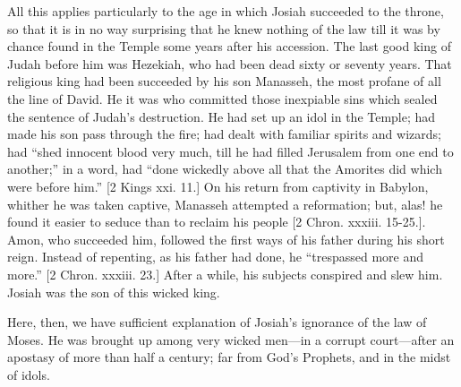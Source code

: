 All this applies particularly to the age in which Josiah succeeded
to the throne, so that it is in no way surprising that he knew nothing
of the law till it was by chance found in the Temple some years after
his accession. The last good king of Judah before him was Hezekiah,
who had been dead sixty or seventy years. That religious king had been
succeeded by his son Manasseh, the most profane of all the line of
David. He it was who committed those inexpiable sins which sealed the
sentence of Judah's destruction. He had set up an idol in the Temple;
had made his son pass through the fire; had dealt with familiar
spirits and wizards; had ``shed innocent blood very much, till he
had filled Jerusalem from one end to another;'' in a word, had
``done wickedly above all that the Amorites did which were before
him.'' [2 Kings xxi. 11.] On his return from captivity in Babylon,
whither he was taken captive, Manasseh attempted a reformation; but,
alas! he found it easier to seduce than to reclaim his people [2 Chron.
xxxiii. 15-25.]. Amon, who succeeded him, followed the first ways of
his father during his short reign. Instead of repenting, as his father
had done, he ``trespassed more and more.'' [2 Chron. xxxiii.
23.] After a while, his subjects conspired and slew him. Josiah was
the son of this wicked king.

Here, then, we have sufficient explanation of Josiah's ignorance of
the law of Moses. He was brought up among very wicked men—in a
corrupt court—after an apostasy of more than half a century; far
from God's Prophets, and in the midst of idols.

